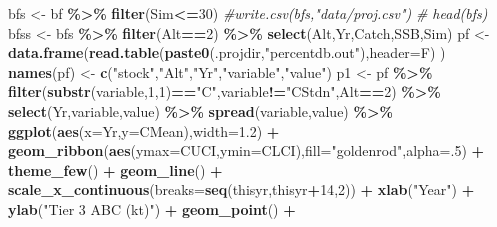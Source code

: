 \documentclass[]{article}
\newenvironment{Shaded}{\begin{snugshade}}{\end{snugshade}}
\newcommand{\CommentTok}[1]{\textcolor[rgb]{0.56,0.35,0.01}{\textit{#1}}}
\newcommand{\DataTypeTok}[1]{\textcolor[rgb]{0.13,0.29,0.53}{#1}}
\newcommand{\DecValTok}[1]{\textcolor[rgb]{0.00,0.00,0.81}{#1}}
\newcommand{\FloatTok}[1]{\textcolor[rgb]{0.00,0.00,0.81}{#1}}
\newcommand{\KeywordTok}[1]{\textcolor[rgb]{0.13,0.29,0.53}{\textbf{#1}}}
\newcommand{\NormalTok}[1]{#1}
\newcommand{\OperatorTok}[1]{\textcolor[rgb]{0.81,0.36,0.00}{\textbf{#1}}}
\newcommand{\StringTok}[1]{\textcolor[rgb]{0.31,0.60,0.02}{#1}}
\begin{document}
\begin{Shaded}
\begin{Highlighting}[]
\NormalTok{  bfs \textless{}{-}}\StringTok{ }\NormalTok{bf }\OperatorTok{\%\textgreater{}\%}\StringTok{ }\KeywordTok{filter}\NormalTok{(Sim}\OperatorTok{\textless{}=}\DecValTok{30}\NormalTok{)}
  \CommentTok{\#write.csv(bfs,"data/proj.csv")}
 \CommentTok{\# head(bfs)}
\NormalTok{  bfss \textless{}{-}}\StringTok{ }\NormalTok{bfs }\OperatorTok{\%\textgreater{}\%}\StringTok{ }\KeywordTok{filter}\NormalTok{(Alt}\OperatorTok{==}\DecValTok{2}\NormalTok{) }\OperatorTok{\%\textgreater{}\%}\StringTok{ }\KeywordTok{select}\NormalTok{(Alt,Yr,Catch,SSB,Sim) }
\NormalTok{  pf \textless{}{-}}\StringTok{ }\KeywordTok{data.frame}\NormalTok{(}\KeywordTok{read.table}\NormalTok{(}\KeywordTok{paste0}\NormalTok{(.projdir,}\StringTok{"percentdb.out"}\NormalTok{),}\DataTypeTok{header=}\NormalTok{F) )}
  \KeywordTok{names}\NormalTok{(pf) \textless{}{-}}\StringTok{ }\KeywordTok{c}\NormalTok{(}\StringTok{"stock"}\NormalTok{,}\StringTok{"Alt"}\NormalTok{,}\StringTok{"Yr"}\NormalTok{,}\StringTok{"variable"}\NormalTok{,}\StringTok{"value"}\NormalTok{) }
\NormalTok{  p1 \textless{}{-}}\StringTok{ }\NormalTok{pf }\OperatorTok{\%\textgreater{}\%}\StringTok{ }\KeywordTok{filter}\NormalTok{(}\KeywordTok{substr}\NormalTok{(variable,}\DecValTok{1}\NormalTok{,}\DecValTok{1}\NormalTok{)}\OperatorTok{==}\StringTok{"C"}\NormalTok{,variable}\OperatorTok{!=}\StringTok{"CStdn"}\NormalTok{,Alt}\OperatorTok{==}\DecValTok{2}\NormalTok{) }\OperatorTok{\%\textgreater{}\%}\StringTok{ }\KeywordTok{select}\NormalTok{(Yr,variable,value) }\OperatorTok{\%\textgreater{}\%}\StringTok{ }\KeywordTok{spread}\NormalTok{(variable,value) }\OperatorTok{\%\textgreater{}\%}
\StringTok{    }\KeywordTok{ggplot}\NormalTok{(}\KeywordTok{aes}\NormalTok{(}\DataTypeTok{x=}\NormalTok{Yr,}\DataTypeTok{y=}\NormalTok{CMean),}\DataTypeTok{width=}\FloatTok{1.2}\NormalTok{) }\OperatorTok{+}\StringTok{ }\KeywordTok{geom\_ribbon}\NormalTok{(}\KeywordTok{aes}\NormalTok{(}\DataTypeTok{ymax=}\NormalTok{CUCI,}\DataTypeTok{ymin=}\NormalTok{CLCI),}\DataTypeTok{fill=}\StringTok{"goldenrod"}\NormalTok{,}\DataTypeTok{alpha=}\NormalTok{.}\DecValTok{5}\NormalTok{) }\OperatorTok{+}\StringTok{ }\KeywordTok{theme\_few}\NormalTok{() }\OperatorTok{+}\StringTok{ }\KeywordTok{geom\_line}\NormalTok{() }\OperatorTok{+}
\StringTok{    }\KeywordTok{scale\_x\_continuous}\NormalTok{(}\DataTypeTok{breaks=}\KeywordTok{seq}\NormalTok{(thisyr,thisyr}\OperatorTok{+}\DecValTok{14}\NormalTok{,}\DecValTok{2}\NormalTok{))  }\OperatorTok{+}\StringTok{  }\KeywordTok{xlab}\NormalTok{(}\StringTok{"Year"}\NormalTok{) }\OperatorTok{+}\StringTok{ }\KeywordTok{ylab}\NormalTok{(}\StringTok{"Tier 3 ABC (kt)"}\NormalTok{) }\OperatorTok{+}\StringTok{ }\KeywordTok{geom\_point}\NormalTok{() }\OperatorTok{+}\StringTok{ }

\end{Highlighting}
\end{Shaded}
\end{document}
